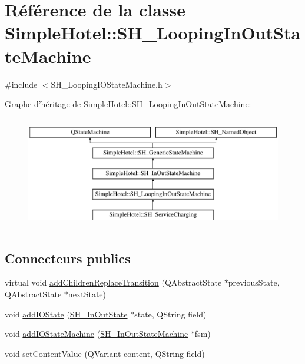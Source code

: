\hypertarget{classSimpleHotel_1_1SH__LoopingInOutStateMachine}{\section{Référence de la classe Simple\-Hotel\-:\-:S\-H\-\_\-\-Looping\-In\-Out\-State\-Machine}
\label{classSimpleHotel_1_1SH__LoopingInOutStateMachine}
}


{\ttfamily \#include $<$S\-H\-\_\-\-Looping\-I\-O\-State\-Machine.\-h$>$}

Graphe d'héritage de Simple\-Hotel\-:\-:S\-H\-\_\-\-Looping\-In\-Out\-State\-Machine\-:\begin{figure}[H]
\begin{center}
\leavevmode
\includegraphics[height=5.000000cm]{classSimpleHotel_1_1SH__LoopingInOutStateMachine}
\end{center}
\end{figure}
\subsection*{Connecteurs publics}
\begin{DoxyCompactItemize}
\item 
virtual void \hyperlink{classSimpleHotel_1_1SH__InOutStateMachine_a3339fd43658e6ac0979bd43014785766}{add\-Children\-Replace\-Transition} (Q\-Abstract\-State $\ast$previous\-State, Q\-Abstract\-State $\ast$next\-State)
\item 
void \hyperlink{classSimpleHotel_1_1SH__InOutStateMachine_a07ae9f1f74a9a41b26e77a014679a33e}{add\-I\-O\-State} (\hyperlink{classSimpleHotel_1_1SH__InOutState}{S\-H\-\_\-\-In\-Out\-State} $\ast$state, Q\-String field)
\item 
void \hyperlink{classSimpleHotel_1_1SH__InOutStateMachine_a27a59a44e0bcddf90d40b38788bb38f4}{add\-I\-O\-State\-Machine} (\hyperlink{classSimpleHotel_1_1SH__InOutStateMachine}{S\-H\-\_\-\-In\-Out\-State\-Machine} $\ast$fsm)
\item 
void \hyperlink{classSimpleHotel_1_1SH__InOutStateMachine_aaf92da452f6cf7cc57aa9e60f88322e4}{set\-Content\-Value} (Q\-Variant content, Q\-String field)
\end{DoxyCompactItemize}
